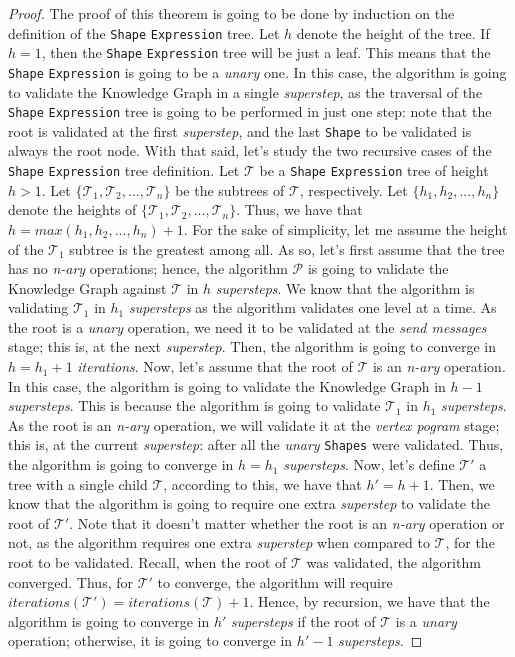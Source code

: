 \begin{proof}
    The proof of this theorem is going to be done by induction on the definition of the \texttt{Shape} \texttt{Expression} tree. Let $h$ denote the height of the tree. If $h = 1$, then the \texttt{Shape} \texttt{Expression} tree will be just a leaf. This means that the \texttt{Shape} \texttt{Expression} is going to be a \textit{unary} one. In this case, the algorithm is going to validate the Knowledge Graph in a single \textit{superstep}, as the traversal of the \texttt{Shape} \texttt{Expression} tree is going to be performed in just one step: note that the root is validated at the first \textit{superstep}, and the last \texttt{Shape} to be validated is always the root node. With that said, let's study the two recursive cases of the \texttt{Shape} \texttt{Expression} tree definition. Let $\mathcal{T}$ be a \texttt{Shape} \texttt{Expression} tree of height $h > 1$. Let $\{\mathcal{T}_1, \mathcal{T}_2, ..., \mathcal{T}_n\}$ be the subtrees of $\mathcal{T}$, respectively. Let $\{h_1, h_2, ..., h_n\}$ denote the heights of $\{\mathcal{T}_1, \mathcal{T}_2, ..., \mathcal{T}_n\}$. Thus, we have that $h = max(h_1, h_2, ..., h_n) + 1$. For the sake of simplicity, let me assume the height of the $\mathcal{T}_1$ subtree is the greatest among all. As so, let's first assume that the tree has no \textit{n-ary} operations; hence, the algorithm $\mathcal{P}$ is going to validate the Knowledge Graph against $\mathcal{T}$ in $h$ \textit{supersteps}. We know that the algorithm is validating $\mathcal{T}_1$ in $h_1$ \textit{supersteps} as the algorithm validates one level at a time. As the root is a \textit{unary} operation, we need it to be validated at the \textit{send messages} stage; this is, at the next \textit{superstep}. Then, the algorithm is going to converge in $h = h_1 + 1$ \textit{iterations}. Now, let's assume that the root of $\mathcal{T}$ is an \textit{n-ary} operation. In this case, the algorithm is going to validate the Knowledge Graph in $h - 1$ \textit{supersteps}. This is because the algorithm is going to validate $\mathcal{T}_1$ in $h_1$ \textit{supersteps}. As the root is an \textit{n-ary} operation, we will validate it at the \textit{vertex pogram} stage; this is, at the current \textit{superstep}: after all the \textit{unary} \texttt{Shapes} were validated. Thus, the algorithm is going to converge in $h = h_1$ \textit{supersteps}. Now, let's define $\mathcal{T'}$ a tree with a single child $\mathcal{T}$, according to this, we have that $h' = h + 1$. Then, we know that the algorithm is going to require one extra \textit{superstep} to validate the root of $\mathcal{T'}$. Note that it doesn't matter whether the root is an \textit{n-ary} operation or not, as the algorithm requires one extra \textit{superstep} when compared to $\mathcal{T}$, for the root to be validated. Recall, when the root of $\mathcal{T}$ was validated, the algorithm converged. Thus, for $\mathcal{T'}$ to converge, the algorithm will require $iterations(\mathcal{T'}) = iterations(\mathcal{T}) + 1$. Hence, by recursion, we have that the algorithm is going to converge in $h'$ \textit{supersteps} if the root of $\mathcal{T}$ is a \textit{unary} operation; otherwise, it is going to converge in $h' - 1$ \textit{supersteps}.
\end{proof}

